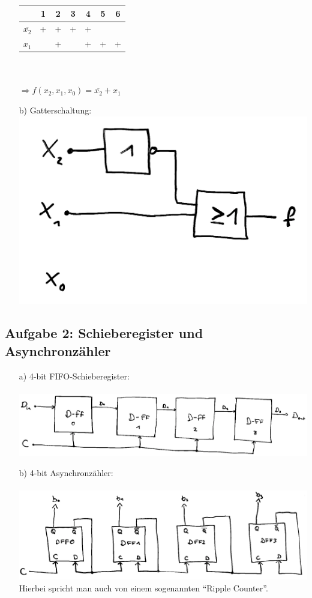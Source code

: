 \documentclass{article}
\begin{document}
\begin{enumerate}
\begin{minipage}{0.5\textwidth}
		\end{minipage}
		\begin{minipage}{0.5\textwidth}
			\renewcommand{\arraystretch}{1.2}
			\begin{tabular}{r|cccccc}
				 					& 1 & 2 & 3 & 4 & 5 & 6 \\ \hline
				$\overline{x_2}$	& + & + & + & + &   &   \\
				$x_1$				&   & + &   & + & + & +
			\end{tabular}\\ \vspace*{1cm} \\
			$\Rightarrow f(x_2, x_1, x_0) = \overline{x_2} + x_1$
		\end{minipage}
		\item[b)]
		Gatterschaltung:\\
		\includegraphics[width=0.3\linewidth]{aufgabe1.png}
	\end{enumerate}


	\subsection*{Aufgabe 2: Schieberegister und Asynchronzähler}
	\begin{enumerate}
		\item[a)] 4-bit FIFO-Schieberegister: \\\\
		\includegraphics[width=\linewidth]{fifo_schieberegister.png}
		\item[b)] 4-bit Asynchronzähler: \\\\
		\includegraphics[width=\linewidth]{asynchron.png} \\
		Hierbei spricht man auch von einem sogenannten "`Ripple Counter"'.
	\end{enumerate}
\end{document}
